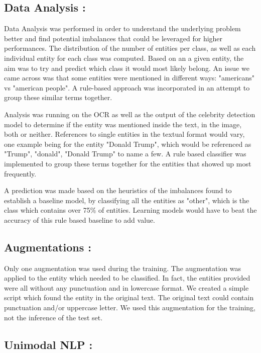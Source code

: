 \documentclass[11pt]{article}
\begin{document}
\subsection{Data Analysis :}
Data Analysis was performed in order to understand the underlying problem better and find potential imbalances that could be leveraged for higher performances. The distribution of the number of entities per class, as well as each individual entity for each class was computed. Based on an a given entity, the aim was to try and predict which class it would most likely belong. An issue we came across was that some entities were mentioned in different ways: "americans" vs "american people". A rule-based approach was incorporated in an attempt to group these similar terms together. 

Analysis was running on the OCR as well as the output of the celebrity detection model to determine if the entity was mentioned inside the text, in the image, both or neither. References to single entities in the textual format would vary, one example being for the entity "Donald Trump", which would be referenced as "Trump", "donald", "Donald Trump" to name a few. A rule based classifier was implemented to group these terms together for the entities that showed up most frequently.

A prediction was made based on the heuristics of the imbalances found to establish a baseline model, by classifying all the entities as "other", which is the class which contains over 75\% of entities. Learning models would have to beat the accuracy of this rule based baseline to add value.

\subsection{Augmentations :}
Only one augmentation was used during the training. The augmentation was applied to the entity which needed to be classified. In fact, the entities provided were all without any punctuation and in lowercase format. We created a simple script which found the entity in the original text. The original text could contain punctuation and/or uppercase letter. We used this augmentation for the training, not the inference of the test set.
\subsection{Unimodal NLP : }
\end{document}
